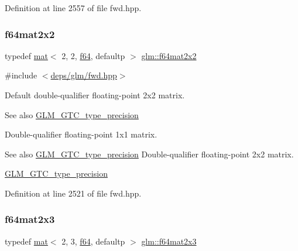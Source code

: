 Definition at line 2557 of file fwd.\+hpp.

\mbox{\label{group__gtc__type__precision_gae18de078e2885803ceda215c6e04a08a}} 
\subsubsection{\texorpdfstring{f64mat2x2}{f64mat2x2}}
{\footnotesize\ttfamily typedef \hyperlink{structglm_1_1mat}{mat}$<$ 2, 2, \hyperlink{group__gtc__type__precision_ga2bba392e555124b36cde6abba349bab3}{f64}, defaultp $>$ \hyperlink{group__gtc__type__precision_gae18de078e2885803ceda215c6e04a08a}{glm\+::f64mat2x2}}



{\ttfamily \#include $<$\hyperlink{fwd_8hpp}{deps/glm/fwd.\+hpp}$>$}

Default double-\/qualifier floating-\/point 2x2 matrix. \begin{DoxySeeAlso}{See also}
\hyperlink{group__gtc__type__precision}{G\+L\+M\+\_\+\+G\+T\+C\+\_\+type\+\_\+precision}
\end{DoxySeeAlso}
Double-\/qualifier floating-\/point 1x1 matrix. \begin{DoxySeeAlso}{See also}
\hyperlink{group__gtc__type__precision}{G\+L\+M\+\_\+\+G\+T\+C\+\_\+type\+\_\+precision} Double-\/qualifier floating-\/point 2x2 matrix. 

\hyperlink{group__gtc__type__precision}{G\+L\+M\+\_\+\+G\+T\+C\+\_\+type\+\_\+precision} 
\end{DoxySeeAlso}


Definition at line 2521 of file fwd.\+hpp.

\mbox{\label{group__gtc__type__precision_ga7816d266eaf216e384c3c6d1e570b9f3}} 
\subsubsection{\texorpdfstring{f64mat2x3}{f64mat2x3}}
{\footnotesize\ttfamily typedef \hyperlink{structglm_1_1mat}{mat}$<$ 2, 3, \hyperlink{group__gtc__type__precision_ga2bba392e555124b36cde6abba349bab3}{f64}, defaultp $>$ \hyperlink{group__gtc__type__precision_ga7816d266eaf216e384c3c6d1e570b9f3}{glm\+::f64mat2x3}}



